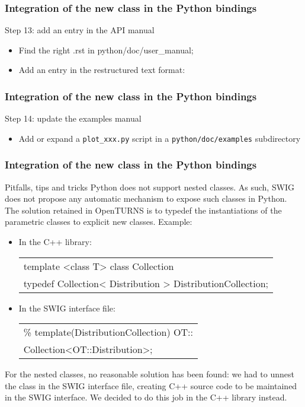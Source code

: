 \documentclass[8pt]{beamer}
\begin{document}
\begin{frame}[containsverbatim]
  \frametitle{Integration of the new class in the Python bindings}
  \begin{block}{Step 13: add an entry in the API manual}
    \begin{itemize}
    \item Find the right .rst in python/doc/user\_manual;
    \item Add an entry in the restructured text format:
    \end{itemize}
  \end{block}
\end{frame}
\begin{frame}[containsverbatim]
  \frametitle{Integration of the new class in the Python bindings}
  \begin{block}{Step 14: update the examples manual}    
    \begin{itemize}
    \item Add or expand a \texttt{plot\_xxx.py} script in a \texttt{python/doc/examples} subdirectory
    \end{itemize}
  \end{block}
\end{frame}
\begin{frame}
  \frametitle{Integration of the new class in the Python bindings}
  \begin{block}{Pitfalls, tips and tricks}
    Python does not support nested classes. As such, SWIG does  not propose any automatic mechanism to expose such classes in Python. The solution retained in OpenTURNS is to typedef the instantiations of the parametric classes to explicit new classes. Example:
    \begin{itemize}
    \item In the C++ library:
      \small
      \begin{tabular}{l}
        \ttfamily template <class T> class Collection \\
        \ttfamily typedef Collection< Distribution > DistributionCollection;
      \end{tabular}
      \normalsize
    \item In the SWIG interface file:
      \small
      \begin{tabular}{l}
        \ttfamily \% template(DistributionCollection) OT::\\
        \ttfamily Collection<OT::Distribution>;
      \end{tabular}
      \normalsize
    \end{itemize}
    For the nested classes, no reasonable solution has been found: we had to unnest the class in the SWIG interface file, creating C++ source code to be maintained in the SWIG interface. We decided to do this job in the C++ library instead.
  \end{block}
\end{frame}
\end{document}
